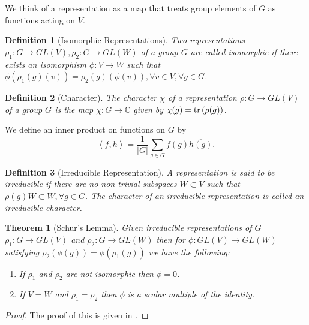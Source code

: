 \documentclass{article}
\theoremstyle{plain}
\newtheorem{theorem}{Theorem}
\theoremstyle{centered}
\newtheorem{definition}{Definition}
\newcommand{\abs}[1]{\left\lvert #1 \right\rvert}
\newcommand{\inner}[2]{\left\langle #1, #2 \right\rangle}
\newcommand{\tr}[1]{\textnormal{tr}\left(#1\right)}
\newcommand{\conj}[1]{\overline{#1}}
\newcommand{\bb}[1]{\mathbb{#1}}
\begin{document}
        We think of a representation as a map that treats group elements of $G$ as functions acting on $V$.

        \begin{definition}[Isomorphic Representations]\label{def:isomorphic_representations}
            Two representations $\rho_1: G \to GL(V), \rho_2: G \to GL(W)$ of a group $G$ are called \textit{isomorphic} if there exists an isomorphism $\phi :V \to W$ such that $\phi(\rho_1(g)(v)) = \rho_2(g)(\phi(v)), \forall v \in V, \forall g \in G$.
        \end{definition}

        \begin{definition}[Character]\label{def:character}
            The \textit{character} $\chi$ of a representation $\rho: G \to GL(V)$ of a group $G$ is the map $\chi: G \to \bb{C}$ given by $\chi(g) = \tr{\rho(g)}$.
        \end{definition}

        We define an inner product on functions on $G$ by
            $$ \inner{f}{h} = \frac{1}{\abs{G}}\sum_{g \in G} f(g) \conj{h(g)}.$$

        \begin{definition}[Irreducible Representation]\label{def:irrep}
            A representation is said to be \textit{irreducible} if there are no non-trivial subspaces $W \subset V$ such that $\rho(g)W \subset W, \forall g \in G$. The \hyperref[def:character]{character} of an irreducible representation is called an \textit{irreducible character}.
        \end{definition}

        \begin{theorem}[Schur's Lemma]\label{thm:schurs_lemma}
            Given irreducible representations of $G$ $\rho_1: G \to GL(V)$ and $\rho_2: G \to GL(W)$ then for $\phi: GL(V) \to GL(W)$ satisfying $\rho_2(\phi(g)) = \phi(\rho_1(g))$ we have the following:
                \begin{enumerate}
                \item If $\rho_1$ and $\rho_2$ are not isomorphic then $\phi = 0$.
                \item If $V = W$ and $\rho_1 = \rho_2$ then $\phi$ is a scalar multiple of the identity.
                \end{enumerate}
        \end{theorem}
        \begin{proof}
            The proof of this is given in \cite{serre}.
        \end{proof}
\end{document}

